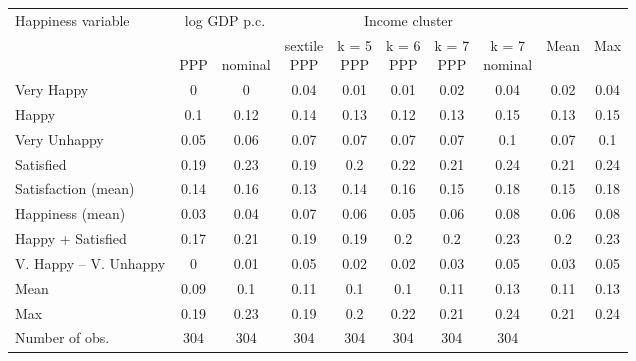 
\begin{tabular}[t]{lccccccccc}
\toprule Happiness variable & \multicolumn{2}{c}{log GDP p.c.} & \multicolumn{5}{c}{Income cluster} & & \\
  & \makecell{\,\\PPP} & \makecell{\,\\nominal} & \makecell{sextile\\PPP} & \makecell{k = 5\\PPP} & \makecell{k = 6\\PPP} & \makecell{k = 7\\PPP} & \makecell{k = 7\\nominal} & Mean & Max\\
\midrule
Very Happy & 0 & 0 & 0.04 & 0.01 & 0.01 & 0.02 & 0.04 & 0.02 & 0.04\\
Happy & 0.1 & 0.12 & 0.14 & 0.13 & 0.12 & 0.13 & 0.15 & 0.13 & 0.15\\
Very Unhappy & 0.05 & 0.06 & 0.07 & 0.07 & 0.07 & 0.07 & 0.1 & 0.07 & 0.1\\
Satisfied & 0.19 & 0.23 & 0.19 & 0.2 & 0.22 & 0.21 & 0.24 & 0.21 & 0.24\\
Satisfaction (mean) & 0.14 & 0.16 & 0.13 & 0.14 & 0.16 & 0.15 & 0.18 & 0.15 & 0.18\\
Happiness (mean) & 0.03 & 0.04 & 0.07 & 0.06 & 0.05 & 0.06 & 0.08 & 0.06 & 0.08\\
Happy + Satisfied & 0.17 & 0.21 & 0.19 & 0.19 & 0.2 & 0.2 & 0.23 & 0.2 & 0.23\\
V. Happy -- V. Unhappy & 0 & 0.01 & 0.05 & 0.02 & 0.02 & 0.03 & 0.05 & 0.03 & 0.05\\ \midrule 
Mean & 0.09 & 0.1 & 0.11 & 0.1 & 0.1 & 0.11 & 0.13 & 0.11 & 0.13\\
Max & 0.19 & 0.23 & 0.19 & 0.2 & 0.22 & 0.21 & 0.24 & 0.21 & 0.24\\ \midrule 
Number of obs. & 304 & 304 & 304 & 304 & 304 & 304 & 304 &  & \\
\bottomrule
\end{tabular}